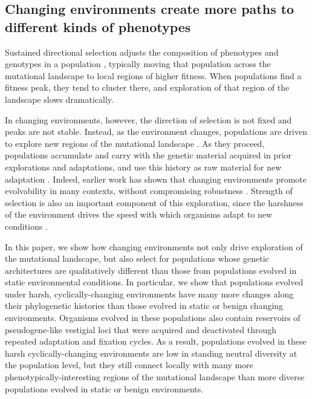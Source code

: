 \documentclass[10pt,letterpaper]{article}
\begin{document}
\subsection*{Changing environments create more paths to different kinds of phenotypes}
Sustained directional selection adjusts the composition of phenotypes and genotypes in a population \cite{wright_evolution_1931}, typically moving that population across the mutational landscape to local regions of higher fitness. When populations find a fitness peak, they tend to cluster there, and
exploration of that region of the landscape slows dramatically.

In changing environments, however, the direction of selection is not fixed and peaks are not stable.  Instead, as the environment changes, populations are driven to explore new regions of the mutational landscape \cite{kashtan_varying_2007,connelly_negative_2015}. As they proceed, populations accumulate and carry with the genetic material acquired in prior explorations and adaptations, and use this history as raw material for new adaptation \cite{mcclintock_significance_1993}. Indeed, earlier work has shown that changing environments promote evolvability in many contexts, without compromising robustness \cite{crombach_evolution_2008,wilke_evolution_2001}. Strength of selection is also an important component of this exploration, since the harshness of the environment drives the speed with which organisms adapt to new conditions \cite{goddard_sex_2005}.

In this paper, we show how changing environments not only drive exploration of the mutational landscape, but also select for populations whose genetic architectures are qualitatively different than those from populations evolved in static environmental conditions. In particular, we show that populations evolved under harsh, cyclically-changing environments have many more changes along their phylogenetic histories than those evolved in static or benign changing environments. Organisms evolved in these populations also contain reservoirs of pseudogene-like vestigial loci that were acquired and deactivated through repeated adaptation and fixation cycles. As a result, populations evolved in these harsh cyclically-changing environments are low in standing neutral diversity at the population level, but they still connect locally with many more phenotypically-interesting regions of the mutational landscape than more diverse populations evolved in static or benign environments.
\end{document}

